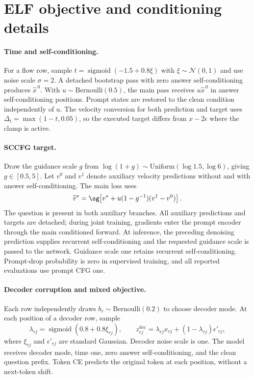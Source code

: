 \section{ELF objective and conditioning details}
\label{app:methodobjective}

\paragraph{Time and self-conditioning.}
For a flow row, sample $t=\operatorname{sigmoid}(-1.5+0.8\xi)$ with $\xi\sim\mathcal N(0,1)$ and use noise scale $\sigma=2$. A detached bootstrap pass with zero answer self-conditioning produces $\widehat x^{\,0}$. With $u\sim\mathrm{Bernoulli}(0.5)$, the main pass receives $u\widehat x^{\,0}$ in answer self-conditioning positions. Prompt states are restored to the clean condition independently of $u$. The velocity conversion for both prediction and target uses $\Delta_t=\max(1-t,0.05)$, so the executed target differs from $x-2\epsilon$ where the clamp is active.

\paragraph{SCCFG target.}
Draw the guidance scale $g$ from $\log(1+g)\sim\mathrm{Uniform}(\log1.5,\log6)$, giving $g\in[0.5,5]$. Let $v^0$ and $v^1$ denote auxiliary velocity predictions without and with answer self-conditioning. The main loss uses
\begin{equation}
 \widetilde v^*=\sg\!\left[v^*+u(1-g^{-1})(v^1-v^0)\right].
 \label{eq:methodscguidance}
\end{equation}
The question is present in both auxiliary branches. All auxiliary predictions and targets are detached; during joint training, gradients enter the prompt encoder through the main conditioned forward. At inference, the preceding denoising prediction supplies recurrent self-conditioning and the requested guidance scale is passed to the network. Guidance scale one retains recurrent self-conditioning. Prompt-drop probability is zero in supervised training, and all reported evaluations use prompt CFG one.

\paragraph{Decoder corruption and mixed objective.}
Each row independently draws $b_r\sim\mathrm{Bernoulli}(0.2)$ to choose decoder mode. At each position of a decoder row, sample
\[
 \lambda_{rj}=\operatorname{sigmoid}(0.8+0.8\xi_{rj}),\qquad
 z^{\mathrm{dec}}_{rj}=\lambda_{rj}x_{rj}+(1-\lambda_{rj})\epsilon'_{rj},
\]
where $\xi_{rj}$ and $\epsilon'_{rj}$ are standard Gaussian. Decoder noise scale is one. The model receives decoder mode, time one, zero answer self-conditioning, and the clean question prefix. Token CE predicts the original token at each position, without a next-token shift.

